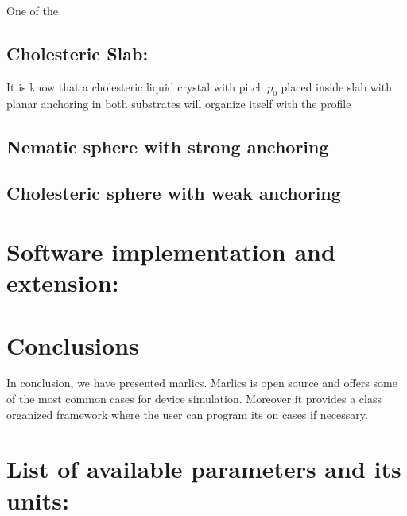 \documentclass[final,5p,times,twocolumn]{elsarticle}
\begin{document}
One of the 

\subsection{Cholesteric Slab:}

It is know that a cholesteric liquid crystal with pitch $p_0$ placed
inside slab with planar anchoring in both substrates will organize
itself with the profile 

\subsection{Nematic sphere with strong anchoring}


\subsection{Cholesteric sphere with weak anchoring}



\section{Software implementation and extension:}

\section{Conclusions}

In conclusion, we have presented marlics. Marlics is open source and
offers some of the most common cases for device simulation. Moreover
it provides a class organized framework where the user can program its
on cases if necessary.  

\label{sec:conclusions}

 \appendix

\section{List of available parameters and its units:}
 \label{apx:list_of_parameters}
\end{document}
